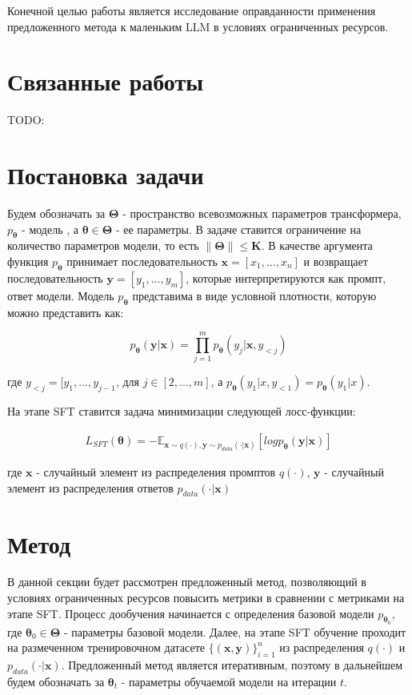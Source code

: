 \documentclass[12pt, twoside]{article}
\newcommand{\bx}{\mathbf{x}}
\newcommand{\by}{\mathbf{y}}
\newcommand{\btheta}{\boldsymbol{\theta}}
\newcommand{\bTheta}{\boldsymbol{\Theta}}
\newcommand{\EE}{\mathbb{E}}
\begin{document}
Конечной целью работы является исследование оправданности применения предложенного метода к маленьким LLM в условиях ограниченных ресурсов.

\vspace{10}

\section{Связанные работы}

TODO:

\vspace{10}

\section{Постановка задачи}

Будем обозначать за $\bTheta$ - пространство всевозможных параметров трансформера, $p_{\btheta}$ - модель , а $\btheta \in \bTheta$ -  ее параметры. В задаче ставится ограничение на количество параметров модели, то есть $\|\bTheta\| \le \mathbf{K}$. В качестве аргумента функция $p_{\btheta}$ принимает последовательность $\bx = [x_1, ..., x_n]$ и возвращает последовательность $\by=[y_1, ..., y_m]$, которые интерпретируются как промпт, ответ модели. Модель $p_{\btheta}$ представима в виде условной плотности, которую можно представить как:

$$p_{\btheta}(\by|\bx) = \prod_{j=1}^m p_{\btheta}(y_j|\bx, y_{<j})$$

где $y_{<j} = [y_1, ..., y_{j-1}$, для $j \in [2, ..., m]$, а $p_{\btheta}(y_1|x, y_{<1}) = p_{\btheta}(y_1|x)$.

На этапе SFT ставится задача минимизации следующей лосс-функции:

\begin{align}
    L_{SFT}(\btheta) = -\EE_{\bx \sim q(\cdot), \by \sim p_{data}(\cdot|\bx)}[log p_{\btheta}(\by|\bx)]
\end{align}

где $\bx$ - случайный элемент из распределения промптов $q(\cdot)$, $\by$ - случайный элемент из распределения ответов $p_{data}(\cdot |\bx)$

\vspace{10}

\section{Метод}


В данной секции будет рассмотрен предложенный метод, позволяющий в условиях ограниченных ресурсов повысить метрики в сравнении с метриками на этапе SFT. Процесс дообучения начинается с определения базовой модели $p_{\btheta_0}$, где $\btheta_0 \in \bTheta$ - параметры базовой модели. Далее, на этапе SFT обучение проходит на размеченном тренировочном датасете $\{(\bx, \by)\}_{i=1}^n$ из распределения $q(\cdot)$ и $p_{data}(\cdot | \bx)$. Предложенный метод является итеративным, поэтому в дальнейшем будем обозначать за $\btheta_t$ - параметры обучаемой модели на итерации $t$.
\end{document}
